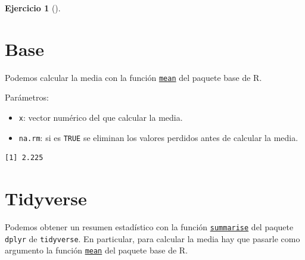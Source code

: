 \documentclass[
  a4paper,
]{scrreport}
\newenvironment{Shaded}{\begin{snugshade}}{\end{snugshade}}
\newcommand{\FunctionTok}[1]{\textcolor[rgb]{0.28,0.35,0.67}{#1}}
\newcommand{\NormalTok}[1]{\textcolor[rgb]{0.00,0.23,0.31}{#1}}
\newcommand{\SpecialCharTok}[1]{\textcolor[rgb]{0.37,0.37,0.37}{#1}}
\providecommand{\tightlist}{%
  \setlength{\itemsep}{0pt}\setlength{\parskip}{0pt}}\usepackage{longtable,booktabs,array}
\theoremstyle{definition}
\newtheorem{exercise}{Ejercicio}[chapter]
\theoremstyle{remark}
\begin{document}
\begin{exercise}[]
\begin{enumerate}
  \begin{tcolorbox}[enhanced jigsaw, colframe=quarto-callout-tip-color-frame, toprule=.15mm, bottomtitle=1mm, breakable, opacitybacktitle=0.6, toptitle=1mm, colback=white, bottomrule=.15mm, title=\textcolor{quarto-callout-tip-color}{\faLightbulb}\hspace{0.5em}{Solución}, arc=.35mm, left=2mm, titlerule=0mm, rightrule=.15mm, coltitle=black, leftrule=.75mm, opacityback=0, colbacktitle=quarto-callout-tip-color!10!white]

  \section{Base}

  Podemos calcular la media con la función
  \href{https://www.rdocumentation.org/packages/base/versions/3.6.2/topics/mean}{\texttt{mean}}
  del paquete base de R.

  Parámetros:

  \begin{itemize}
  \tightlist
  \item
    \texttt{x}: vector numérico del que calcular la media.
  \item
    \texttt{na.rm}: si es \texttt{TRUE} se eliminan los valores perdidos
    antes de calcular la media.
  \end{itemize}

\begin{Shaded}
\end{Shaded}

\begin{verbatim}
[1] 2.225
\end{verbatim}

  \section{Tidyverse}

  Podemos obtener un resumen estadístico con la función
  \href{https://dplyr.tidyverse.org/reference/summarise.html}{\texttt{summarise}}
  del paquete \texttt{dplyr} de \texttt{tidyverse}. En particular, para
  calcular la media hay que pasarle como argumento la función
  \href{https://www.rdocumentation.org/packages/base/versions/3.6.2/topics/mean}{\texttt{mean}}
  del paquete base de R.


\end{tcolorbox}
\end{enumerate}
\end{exercise}
\end{document}
